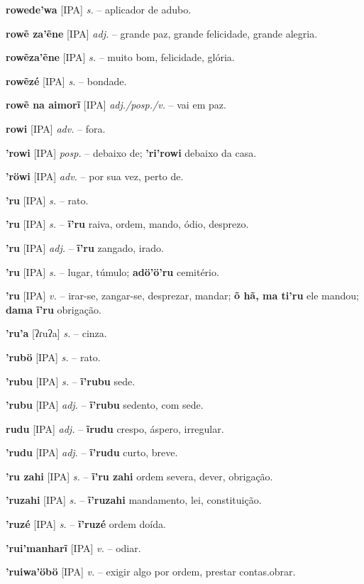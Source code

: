 \textbf{rowede'wa} [IPA] \textit{s.} -- aplicador de adubo.

\textbf{rowẽ za'ẽne} [IPA] \textit{adj.} -- grande paz, grande felicidade, grande alegria.

\textbf{rowẽza'ẽne} [IPA] \textit{s.} -- muito bom, felicidade, glória.

\textbf{rowẽzé} [IPA] \textit{s.} -- bondade.

\textbf{rowẽ na aimorĩ} [IPA] \textit{adj./posp./v.} -- vai em paz.

\textbf{rowi} [IPA] \textit{adv.} -- fora.

\textbf{'rowi} [IPA] \textit{posp.} -- debaixo de; \textbf{'ri'rowi} debaixo da casa.

\textbf{'röwi} [IPA] \textit{adv.} -- por sua vez, perto de.

\textbf{'ru} [IPA] \textit{s.} -- rato.

\textbf{'ru} [IPA] \textit{s.} -- \textbf{ĩ'ru} raiva, ordem, mando, ódio, desprezo.

\textbf{'ru} [IPA] \textit{adj.} -- \textbf{ĩ'ru} zangado, irado.

\textbf{'ru} [IPA] \textit{s.} -- lugar, túmulo; \textbf{adö'ö'ru} cemitério.

\textbf{'ru} [IPA] \textit{v.} -- irar-se, zangar-se, desprezar, mandar; \textbf{õ hã, ma ti'ru} ele mandou; \textbf{dama ĩ'ru} obrigação.

\textbf{'ru'a} [ʔɾuʔa] \textit{s.} -- cinza.

\textbf{'rubö} [IPA] \textit{s.} -- rato.

\textbf{'rubu} [IPA] \textit{s.} -- \textbf{ĩ'rubu} sede.

\textbf{'rubu} [IPA] \textit{adj.} -- \textbf{ĩ'rubu} sedento, com sede.

\textbf{rudu} [IPA] \textit{adj.} -- \textbf{ĩrudu} crespo, áspero, irregular.

\textbf{'rudu} [IPA] \textit{adj.} -- \textbf{ĩ'rudu} curto, breve.

\textbf{'ru zahi} [IPA] \textit{s.} -- \textbf{ĩ'ru zahi} ordem severa, dever, obrigação.

\textbf{'ruzahi} [IPA] \textit{s.} -- \textbf{ĩ'ruzahi} mandamento, lei, constituição.

\textbf{'ruzé} [IPA] \textit{s.} -- \textbf{ĩ'ruzé} ordem doída.

\textbf{'rui'manharĩ} [IPA] \textit{v.} -- odiar.

\textbf{'ruiwa'öbö} [IPA] \textit{v.} -- exigir algo por ordem, prestar contas.obrar.

